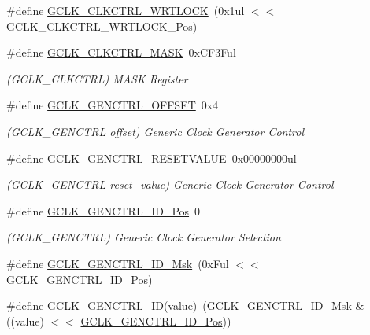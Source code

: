 \begin{DoxyCompactItemize}
\#define \mbox{\hyperlink{group___s_a_m_d21___g_c_l_k_gaf103e645170000a9aa8af219a63d54c5}{G\+C\+L\+K\+\_\+\+C\+L\+K\+C\+T\+R\+L\+\_\+\+W\+R\+T\+L\+O\+CK}}~(0x1ul $<$$<$ G\+C\+L\+K\+\_\+\+C\+L\+K\+C\+T\+R\+L\+\_\+\+W\+R\+T\+L\+O\+C\+K\+\_\+\+Pos)
\item 
\#define \mbox{\hyperlink{group___s_a_m_d21___g_c_l_k_ga7cd3bae1a32142ecb56cff34f18b856f}{G\+C\+L\+K\+\_\+\+C\+L\+K\+C\+T\+R\+L\+\_\+\+M\+A\+SK}}~0x\+C\+F3\+Ful
\begin{DoxyCompactList}\small\item\em (G\+C\+L\+K\+\_\+\+C\+L\+K\+C\+T\+RL) M\+A\+SK Register \end{DoxyCompactList}\item 
\#define \mbox{\hyperlink{group___s_a_m_d21___g_c_l_k_ga93d991084be98b48eb3bd242d2114042}{G\+C\+L\+K\+\_\+\+G\+E\+N\+C\+T\+R\+L\+\_\+\+O\+F\+F\+S\+ET}}~0x4
\begin{DoxyCompactList}\small\item\em (G\+C\+L\+K\+\_\+\+G\+E\+N\+C\+T\+RL offset) Generic Clock Generator Control \end{DoxyCompactList}\item 
\#define \mbox{\hyperlink{group___s_a_m_d21___g_c_l_k_ga6fe333c528ab24313886414224566cfc}{G\+C\+L\+K\+\_\+\+G\+E\+N\+C\+T\+R\+L\+\_\+\+R\+E\+S\+E\+T\+V\+A\+L\+UE}}~0x00000000ul
\begin{DoxyCompactList}\small\item\em (G\+C\+L\+K\+\_\+\+G\+E\+N\+C\+T\+RL reset\+\_\+value) Generic Clock Generator Control \end{DoxyCompactList}\item 
\#define \mbox{\hyperlink{group___s_a_m_d21___g_c_l_k_ga4a60c72f4513306209ee3853e022a8ec}{G\+C\+L\+K\+\_\+\+G\+E\+N\+C\+T\+R\+L\+\_\+\+I\+D\+\_\+\+Pos}}~0
\begin{DoxyCompactList}\small\item\em (G\+C\+L\+K\+\_\+\+G\+E\+N\+C\+T\+RL) Generic Clock Generator Selection \end{DoxyCompactList}\item 
\#define \mbox{\hyperlink{group___s_a_m_d21___g_c_l_k_ga7f828f420efccc8f0524f5fccb07a7db}{G\+C\+L\+K\+\_\+\+G\+E\+N\+C\+T\+R\+L\+\_\+\+I\+D\+\_\+\+Msk}}~(0x\+Ful $<$$<$ G\+C\+L\+K\+\_\+\+G\+E\+N\+C\+T\+R\+L\+\_\+\+I\+D\+\_\+\+Pos)
\item 
\#define \mbox{\hyperlink{group___s_a_m_d21___g_c_l_k_gacd482b8619c8d7d70d181e958bea77cb}{G\+C\+L\+K\+\_\+\+G\+E\+N\+C\+T\+R\+L\+\_\+\+ID}}(value)~(\mbox{\hyperlink{group___s_a_m_d21___g_c_l_k_ga7f828f420efccc8f0524f5fccb07a7db}{G\+C\+L\+K\+\_\+\+G\+E\+N\+C\+T\+R\+L\+\_\+\+I\+D\+\_\+\+Msk}} \& ((value) $<$$<$ \mbox{\hyperlink{group___s_a_m_d21___g_c_l_k_ga4a60c72f4513306209ee3853e022a8ec}{G\+C\+L\+K\+\_\+\+G\+E\+N\+C\+T\+R\+L\+\_\+\+I\+D\+\_\+\+Pos}}))
$$
\end{DoxyCompactItemize}
